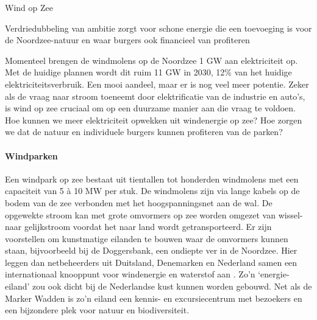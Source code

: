 \begin{voorstel}{Wind op Zee}


\begin{samenvatting}
Verdriedubbeling van ambitie zorgt voor schone energie die een toevoeging is voor de Noordzee-natuur en waar burgers ook financieel van profiteren
\end{samenvatting}

\begin{multicols}{2}

\begin{uitdaging}
Momenteel brengen de windmolens op de Noordzee 1 GW aan elektriciteit op. Met de huidige plannen wordt dit ruim 11 GW in 2030, 12\% van het huidige elektriciteitsverbruik. Een mooi aandeel, maar er is nog veel meer potentie. Zeker als de vraag naar stroom toeneemt door elektrificatie van de industrie en auto’s, is wind op zee cruciaal om op een duurzame manier aan die vraag te voldoen. Hoe kunnen we meer elektriciteit opwekken uit windenergie op zee? Hoe zorgen we dat de natuur en individuele burgers kunnen profiteren van de parken?
\end{uitdaging}

\begin{overwegingen}
\paragraph{Windparken}
Een windpark op zee bestaat uit tientallen tot honderden windmolens met een capaciteit van 5 à 10 MW per stuk. De windmolens zijn via lange kabels op de bodem van de zee verbonden met het hoogspanningsnet aan de wal. De opgewekte stroom kan met grote omvormers op zee worden omgezet van wissel- naar gelijkstroom voordat het naar land wordt getransporteerd. Er zijn voorstellen om kunstmatige eilanden te bouwen waar de omvormers kunnen staan, bijvoorbeeld bij de Doggersbank, een ondiepte ver in de Noordzee. Hier leggen dan netbeheerders uit Duitsland, Denemarken en Nederland samen een internationaal knooppunt voor windenergie en waterstof aan \parencite{north_sea_wind_power_hub_north_2019}. Zo’n `energie-eiland' zou ook dicht bij de Nederlandse kust kunnen worden gebouwd. Net als de Marker Wadden is zo’n eiland een kennis- en excursiecentrum met bezoekers en een bijzondere plek voor natuur en biodiversiteit.


\end{overwegingen}
\end{multicols}
\end{voorstel}
